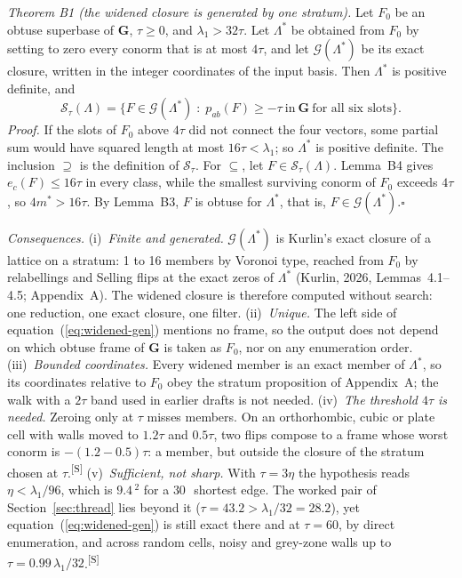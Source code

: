 \documentclass[preprint,pdf]{iucr}          %
\makeatletter
\newcommand{\Ang}{\text{\AA}}
\newcommand{\Gmet}{\mathbf{G}}
\newcommand{\Sclosure}{\mathcal{S}}
\newcommand{\chk}[1]{\textsuperscript{[S\@nameuse{zn@#1}]}}
\makeatother
\begin{document}
\emph{Theorem B1 (the widened closure is generated by one stratum).} Let $F_0$ be an obtuse superbase of $\Gmet$, $\tau\ge0$, and $\lambda_1>32\tau$. Let $\Lambda^*$ be obtained from $F_0$ by setting to zero every conorm that is at most $4\tau$, and let $\mathcal G(\Lambda^*)$ be its exact closure, written in the integer coordinates of the input basis. Then $\Lambda^*$ is positive definite, and
\begin{equation}
\Sclosure_\tau(\Lambda)=\bigl\{F\in\mathcal G(\Lambda^*)\;:\;p_{ab}(F)\ge-\tau\ \text{in}\ \Gmet\ \text{for all six slots}\bigr\}.
\label{eq:widened-gen}
\end{equation}
\emph{Proof.} If the slots of $F_0$ above $4\tau$ did not connect the four vectors, some partial sum would have squared length at most $16\tau<\lambda_1$; so $\Lambda^*$ is positive definite. The inclusion $\supseteq$ is the definition of $\Sclosure_\tau$. For $\subseteq$, let $F\in\Sclosure_\tau(\Lambda)$. Lemma~B4 gives $e_c(F)\le16\tau$ in every class, while the smallest surviving conorm of $F_0$ exceeds $4\tau$, so $4m^*>16\tau$. By Lemma~B3, $F$ is obtuse for $\Lambda^*$, that is, $F\in\mathcal G(\Lambda^*)$.\hfill$\square$

\emph{Consequences.} (i)~\emph{Finite and generated.} $\mathcal G(\Lambda^*)$ is Kurlin's exact closure of a lattice on a stratum: 1 to 16 members by Voronoi type, reached from $F_0$ by relabellings and Selling flips at the exact zeros of $\Lambda^*$ (Kurlin, 2026, Lemmas~4.1--4.5; Appendix~A). The widened closure is therefore computed without search: one reduction, one exact closure, one filter. (ii)~\emph{Unique.} The left side of equation~(\ref{eq:widened-gen}) mentions no frame, so the output does not depend on which obtuse frame of $\Gmet$ is taken as $F_0$, nor on any enumeration order. (iii)~\emph{Bounded coordinates.} Every widened member is an exact member of $\Lambda^*$, so its coordinates relative to $F_0$ obey the stratum proposition of Appendix~A; the walk with a $2\tau$ band used in earlier drafts is not needed. (iv)~\emph{The threshold $4\tau$ is needed.} Zeroing only at $\tau$ misses members. On an orthorhombic, cubic or plate cell with walls moved to $1.2\tau$ and $0.5\tau$, two flips compose to a frame whose worst conorm is $-(1.2-0.5)\tau$: a member, but outside the closure of the stratum chosen at $\tau$.\chk{z:widened-complete} (v)~\emph{Sufficient, not sharp.} With $\tau=3\eta$ the hypothesis reads $\eta<\lambda_1/96$, which is $9.4$\,\Ang$^2$ for a $30$\,\Ang\ shortest edge. The worked pair of Section~\ref{sec:thread} lies beyond it ($\tau=43.2>\lambda_1/32=28.2$), yet equation~(\ref{eq:widened-gen}) is still exact there and at $\tau=60$, by direct enumeration, and across random cells, noisy and grey-zone walls up to $\tau=0.99\,\lambda_1/32$.\chk{z:widened-complete}
\end{document}
